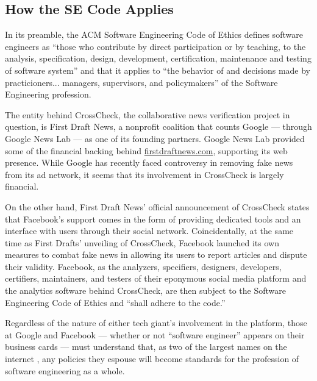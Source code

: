 
\subsection{How the SE Code Applies}

\par In its preamble, the ACM Software Engineering Code of Ethics defines software engineers as ``those who contribute by direct participation or by teaching, to the analysis, specification, design, development, certification, maintenance and testing of software system'' and that it applies to ``the behavior of and decisions made by practicioners... managers, supervisors, and policymakers'' of the Software Engineering profession. \cite{se_code}

\par The entity behind CrossCheck, the collaborative news verification project in question, is First Draft News, a nonprofit coalition that counts Google --- through Google News Lab --- as one of its founding partners. Google News Lab provided some of the financial backing behind \url{firstdraftnews.com}, supporting its web presence. \cite{firstdraftnews_about} While Google has recently faced controversy in removing fake news from its ad network, \cite{tc_google_took_down_ads} it seems that its involvement in CrossCheck is largely financial.

\par On the other hand, First Draft News' official announcement of CrossCheck states that Facebook's support comes in the form of providing dedicated tools and an interface with users through their social network. \cite{crosscheck_launch} Coincidentally, at the same time as First Drafts' unveiling of CrossCheck, Facebook launched its own measures to combat fake news in allowing its users to report articles and dispute their validity. \cite{tc_google_fb_partner} Facebook, as the analyzers, specifiers, designers, developers, certifiers, maintainers, and testers of their eponymous social media platform and the analytics software behind CrossCheck, are then subject to the Software Engineering Code of Ethics and ``shall adhere to the code.'' \cite{se_code}

\par Regardless of the nature of either tech giant's involvement in the platform, those at Google and Facebook --- whether or not ``software engineer'' appears on their business cards --- must understand that, as two of the largest names on the internet , any policies they espouse will become standards for the profession of software engineering as a whole.

